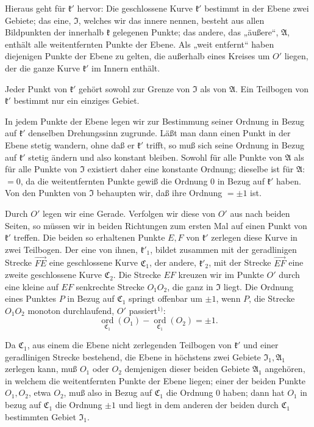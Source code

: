 \documentclass{article}
\begin{document}
Hieraus geht für $\mathfrak{k}'$ hervor: Die geschlossene Kurve $\mathfrak{k}'$ bestimmt in der Ebene zwei Gebiete; das eine, $\mathfrak{I}$, welches wir das innere nennen, besteht aus allen Bildpunkten der innerhalb $\mathfrak{k}$ gelegenen Punkte; das andere, das „äußere“, $\mathfrak{A}$, enthält alle weitentfernten Punkte der Ebene. Als „weit entfernt“ haben diejenigen Punkte der Ebene zu gelten, die außerhalb eines Kreises um $O'$ liegen, der die ganze Kurve $\mathfrak{k}'$ im Innern enthält.

Jeder Punkt von $\mathfrak{k}'$ gehört sowohl zur Grenze von $\mathfrak{I}$ als von $\mathfrak{A}$. Ein Teilbogen von $\mathfrak{k}'$ bestimmt nur ein einziges Gebiet.

In jedem Punkte der Ebene legen wir zur Bestimmung seiner Ordnung in Bezug auf $\mathfrak{k}'$ denselben Drehungssinn zugrunde. Läßt man dann einen Punkt in der Ebene stetig wandern, ohne daß er $\mathfrak{k}'$ trifft, so muß sich seine Ordnung in Bezug auf $\mathfrak{k}'$ stetig ändern und also konstant bleiben. Sowohl für alle Punkte von $\mathfrak{A}$ als für alle Punkte von $\mathfrak{I}$ existiert daher eine konstante Ordnung; dieselbe ist für $\mathfrak{A}$: $= 0$, da die weitentfernten Punkte gewiß die Ordnung $0$ in Bezug auf $\mathfrak{k}'$ haben. Von den Punkten von $\mathfrak{I}$ behaupten wir, daß ihre Ordnung $= \pm 1$ ist.

Durch $O'$ legen wir eine Gerade. Verfolgen wir diese von $O'$ aus nach beiden Seiten, so müssen wir in beiden Richtungen zum ersten Mal auf einen Punkt von $\mathfrak{k}'$ treffen. Die beiden so erhaltenen Punkte $E, F$ von $\mathfrak{k}'$ zerlegen diese Kurve in zwei Teilbogen. Der eine von ihnen, $\mathfrak{k}'_1$, bildet zusammen mit der geradlinigen Strecke $\overrightarrow{FE}$ eine geschlossene Kurve $\mathfrak{C}_1$, der andere, $\mathfrak{k}'_2$, mit der Strecke $\overrightarrow{EF}$ eine zweite geschlossene Kurve $\mathfrak{C}_2$. Die Strecke $EF$ kreuzen wir im Punkte $O'$ durch eine kleine auf $EF$ senkrechte Strecke $O_1 O_2$, die ganz in $\mathfrak{I}$ liegt. Die Ordnung eines Punktes $P$ in Bezug auf $\mathfrak{C}_1$ springt offenbar um $\pm 1$, wenn $P$, die Strecke $O_1 O_2$ monoton durchlaufend, $O'$ passiert${}^{1)}$:
\[ \underset{\mathfrak{C}_1}{\operatorname{ord}} (O_1) - \underset{\mathfrak{C}_1}{\operatorname{ord}} (O_2) = \pm 1. \]


Da $\mathfrak{C}_1$, aus einem die Ebene nicht zerlegenden Teilbogen von $\mathfrak{k}'$ und einer geradlinigen Strecke bestehend, die Ebene in höchstens zwei Gebiete $\mathfrak{I}_1, \mathfrak{A}_1$ zerlegen kann, muß $O_1$ oder $O_2$ demjenigen dieser beiden Gebiete $\mathfrak{A}_1$ angehören, in welchem die weitentfernten Punkte der Ebene liegen; einer der beiden Punkte $O_1, O_2$, etwa $O_2$, muß also in Bezug auf $\mathfrak{C}_1$ die Ordnung $0$ haben; dann hat $O_1$ in bezug auf $\mathfrak{C}_1$ die Ordnung $\pm 1$ und liegt in dem anderen der beiden durch $\mathfrak{C}_1$ bestimmten Gebiet $\mathfrak{I}_1$.
\end{document}
